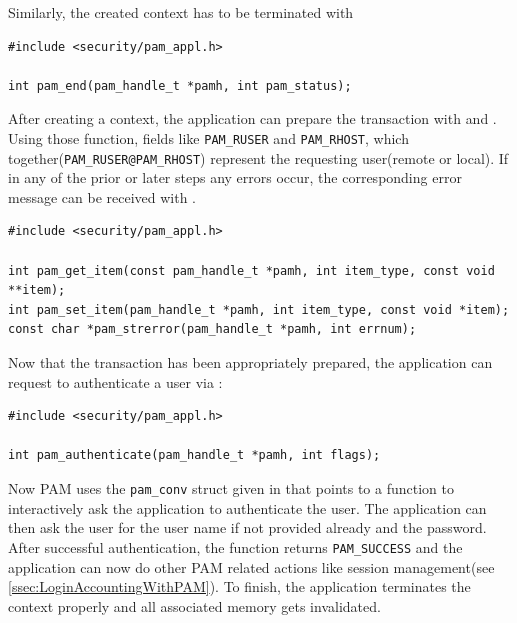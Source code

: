 \documentclass[10pt,a4paper,titlepage,twoside,english,final]{zhawreprt}
\begin{document}
Similarly, the created context has to be terminated with \cite{pam_end}
\setlistingC
\begin{lstlisting}[caption={Terminating a \gls{PAM} context},label=lst:TermPAMContext]
#include <security/pam_appl.h>

int pam_end(pam_handle_t *pamh, int pam_status);
\end{lstlisting}

After creating a context, the application can prepare the transaction with \cite{pam_set_item} and \cite{pam_get_item}. Using those function, fields like \texttt{PAM\_RUSER} and \texttt{PAM\_RHOST}, which together(\texttt{PAM\_RUSER@PAM\_RHOST}) represent the requesting user(remote or local). If in any of the prior or later steps any errors occur, the corresponding error message can be received with \cite{pam_strerror}.
\setlistingC
\begin{lstlisting}[caption={\gls{PAM} functions},label=lst:PAMFunctions]
#include <security/pam_appl.h>

int pam_get_item(const pam_handle_t *pamh, int item_type, const void **item);
int pam_set_item(pam_handle_t *pamh, int item_type, const void *item);
const char *pam_strerror(pam_handle_t *pamh, int errnum);
\end{lstlisting}

Now that the transaction has been appropriately prepared, the application can request to authenticate a user via \cite{pam_authenticate}:
\setlistingC
\begin{lstlisting}[caption={\gls{PAM} authentication},label=lst:PAMAuthentication]
#include <security/pam_appl.h>

int pam_authenticate(pam_handle_t *pamh, int flags);
\end{lstlisting}

Now \gls{PAM} uses the \texttt{pam\_conv} struct given in \cite{pam_start} that points to a function to interactively ask the application to authenticate the user. The application can then ask the user for the user name if not provided already and the password. After successful authentication, the function returns \texttt{PAM\_SUCCESS} and the application can now do other \gls{PAM} related actions like session management(see \ref{ssec:LoginAccountingWithPAM}). To finish, the application terminates the context properly and all associated memory gets invalidated.
\end{document}
